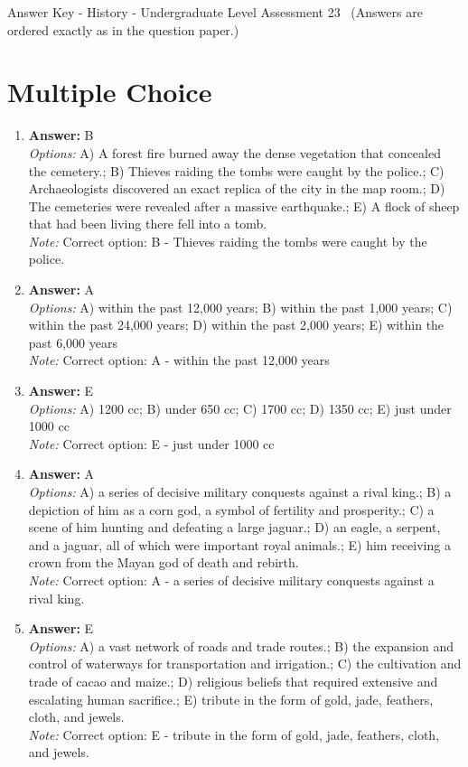 \documentclass[12pt]{article}
\begin{document}
\begin{center}
Answer Key - History - Undergraduate Level Assessment 23 \
\small (Answers are ordered exactly as in the question paper.)
\end{center}

\section*{Multiple Choice}
\begin{enumerate}[label=\arabic*.]
\item \textbf{Answer:} B
\\ \textit{Options:} A) A forest fire burned away the dense vegetation that concealed the cemetery.; B) Thieves raiding the tombs were caught by the police.; C) Archaeologists discovered an exact replica of the city in the map room.; D) The cemeteries were revealed after a massive earthquake.; E) A flock of sheep that had been living there fell into a tomb.
\\ \textit{Note:} Correct option: B - Thieves raiding the tombs were caught by the police.
\item \textbf{Answer:} A
\\ \textit{Options:} A) within the past 12,000 years; B) within the past 1,000 years; C) within the past 24,000 years; D) within the past 2,000 years; E) within the past 6,000 years
\\ \textit{Note:} Correct option: A - within the past 12,000 years
\item \textbf{Answer:} E
\\ \textit{Options:} A) 1200 cc; B) under 650 cc; C) 1700 cc; D) 1350 cc; E) just under 1000 cc
\\ \textit{Note:} Correct option: E - just under 1000 cc
\item \textbf{Answer:} A
\\ \textit{Options:} A) a series of decisive military conquests against a rival king.; B) a depiction of him as a corn god, a symbol of fertility and prosperity.; C) a scene of him hunting and defeating a large jaguar.; D) an eagle, a serpent, and a jaguar, all of which were important royal animals.; E) him receiving a crown from the Mayan god of death and rebirth.
\\ \textit{Note:} Correct option: A - a series of decisive military conquests against a rival king.
\item \textbf{Answer:} E
\\ \textit{Options:} A) a vast network of roads and trade routes.; B) the expansion and control of waterways for transportation and irrigation.; C) the cultivation and trade of cacao and maize.; D) religious beliefs that required extensive and escalating human sacrifice.; E) tribute in the form of gold, jade, feathers, cloth, and jewels.
\\ \textit{Note:} Correct option: E - tribute in the form of gold, jade, feathers, cloth, and jewels.
\end{enumerate}
\end{document}
